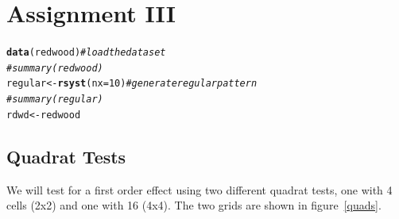 \documentclass{article}\usepackage[]{graphicx}\usepackage[]{color}
\makeatletter
\newcommand{\hlnum}[1]{\textcolor[rgb]{0.686,0.059,0.569}{#1}}%
\newcommand{\hlcom}[1]{\textcolor[rgb]{0.678,0.584,0.686}{\textit{#1}}}%
\newcommand{\hlstd}[1]{\textcolor[rgb]{0.345,0.345,0.345}{#1}}%
\newcommand{\hlkwb}[1]{\textcolor[rgb]{0.69,0.353,0.396}{#1}}%
\newcommand{\hlkwc}[1]{\textcolor[rgb]{0.333,0.667,0.333}{#1}}%
\newcommand{\hlkwd}[1]{\textcolor[rgb]{0.737,0.353,0.396}{\textbf{#1}}}%
\newenvironment{kframe}{%
 \def\at@end@of@kframe{}%
 \ifinner\ifhmode%
  \def\at@end@of@kframe{\end{minipage}}%
  \begin{minipage}{\columnwidth}%
 \fi\fi%
 \def\FrameCommand##1{\hskip\@totalleftmargin \hskip-\fboxsep
 \colorbox{shadecolor}{##1}\hskip-\fboxsep
     \hskip-\linewidth \hskip-\@totalleftmargin \hskip\columnwidth}%
 \MakeFramed {\advance\hsize-\width
   \@totalleftmargin\z@ \linewidth\hsize
   \@setminipage}}%
 {\par\unskip\endMakeFramed%
 \at@end@of@kframe}
\newenvironment{knitrout}{}{} %
\makeatother
\begin{document}
\FloatBarrier

\section{Assignment III}

\begin{knitrout}
\color{fgcolor}\begin{kframe}
\begin{alltt}
\hlkwd{data}\hlstd{(redwood)} \hlcom{#load the dataset}
\hlcom{# summary(redwood)}
\hlstd{regular}\hlkwb{<-}\hlkwd{rsyst}\hlstd{(}\hlkwc{nx}\hlstd{=}\hlnum{10}\hlstd{)} \hlcom{#generate regular pattern}
\hlcom{# summary(regular)}
\hlstd{rdwd}\hlkwb{<-}\hlstd{redwood}
\end{alltt}
\end{kframe}
\end{knitrout}

\subsection{Quadrat Tests}
We will test for a first order effect using two different quadrat tests, one with 4 cells (2x2) and one with 16 (4x4).  The two grids are shown in figure~\ref{quads}.\\
\end{document}

